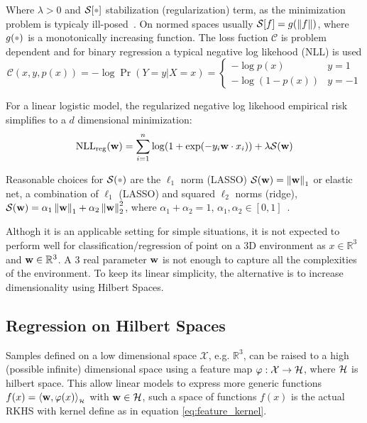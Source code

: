Where $\lambda>0$ and $\mathcal{S}[\parm]$ stabilization (regularization) term,
as the minimization problem is typicaly
ill-posed~\cite{jaakkola1999probabilistic}. On normed spaces usually
$\mathcal{S}[f]=g(\left\lVert f\right\rVert)$, where $g(\parm)$ is a monotonically increasing
function.
The loss fuction $\mathscr{C}$ is problem dependent and for binary regression a typical negative log likehood (NLL) is used
\begin{equation}
\mathscr{C}(x,y,p(x)) = - \log \Pr(Y=y|X=x) = 
\begin{cases} 
      - \log p(x) & y=1 \\
      - \log (1-p(x)) & y=-1
   \end{cases}
\end{equation}

For a linear logistic model, the regularized negative log likehood empirical
risk simplifies to a $d$ dimensional minimization:
\begin{equation}
\label{eq:classicnll}
\text{NLL}_{\text{reg}}(\mathrm{\mathbf{w}}) =  \sum_{i=1}^n \log(1+\exp(-y_i
\mathrm{\mathbf{w}}\cdot x_i)) +\lambda\mathcal{S}(\mathrm{\mathbf{w}})
\end{equation}


Reasonable choices for $\mathcal{S}(\parm)$
are the $\ell_1$ norm (LASSO)
$\mathcal{S}(\mathrm{\mathbf{w}})=\left\lVert\mathrm{\mathbf{w}}\right\rVert_1$
or elastic net, a combination of $\ell_1$ (LASSO) and
squared $\ell_2$ norms (ridge),
$\mathcal{S}(\mathrm{\mathbf{w}})=\alpha_1\left\lVert\mathrm{\mathbf{w}}\right\rVert_1
+\alpha_2\left\lVert\mathrm{\mathbf{w}}\right\rVert_2^2$, where
$\alpha_1+\alpha_2=1$, $\alpha_1,\alpha_2\in[0,1]$~\cite{hastie2015statistical}.


Althogh it is an applicable setting for simple situations, it is not expected to
perform well for classification/regression of point on a 3D environment as
$x\in\mathbb{R}^3$ and $\mathrm{\mathbf{w}}\in\mathbb{R}^3$. A 3 real parameter
$\mathrm{\mathbf{w}}$ is not enough to capture all the complexities of the environment. To
keep its linear simplicity, the alternative is to increase dimensionality using
Hilbert Spaces.

\subsection{Regression on Hilbert Spaces}

Samples defined on a low dimensional space $\mathcal{X}$, e.g. $\mathbb{R}^3$,
can be raised to a high (possible infinite) dimensional space using a feature
map $\varphi:\mathcal{X}\to\mathcal{H}$, where $\mathcal{H}$ is hilbert space. This allow
linear models to express more generic functions $f(x) =
\langle \mathrm{\mathbf{w}},\varphi(x)\rangle_{_{\mathcal{H}}}$ with $\mathrm{\mathbf{w}}\in\mathcal{H}$, such a space of functions
$f(x)$ is the actual RKHS with kernel define as in equation
\ref{eq:feature_kernel}.

